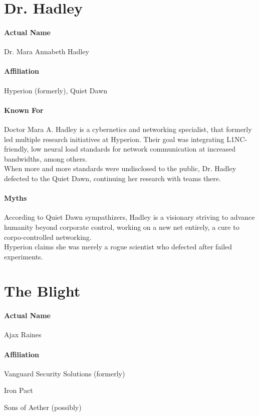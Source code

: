 \section*{Dr. Hadley}
\paragraph{Actual Name}
	Dr. Mara Annabeth Hadley
\paragraph{Affiliation}
	Hyperion (formerly), Quiet Dawn
\paragraph{Known For}
	Doctor Mara A. Hadley is a cybernetics and networking specialist, that formerly led multiple research initiatives at Hyperion.
	Their goal was integrating L1NC-friendly, low neural load standards for network communication at increased bandwidths, among others.
	\\%
	When more and more standards were undisclosed to the public, Dr. Hadley defected to the Quiet Dawn, continuing her research with teams there.
\paragraph{Myths}
	According to Quiet Dawn sympathizers, Hadley is a visionary striving to advance humanity beyond corporate control, working on a new net entirely, a cure to corpo-controlled networking.
	\\%
	Hyperion claims she was merely a rogue scientist who defected after failed experiments.

\section*{The Blight}
\paragraph{Actual Name}
	Ajax Raines
\paragraph{Affiliation}
	\begin{sitemize}
		\item Vanguard Security Solutions (formerly)
		\item Iron Pact
		\item Sons of Aether (possibly)
	\end{sitemize}
